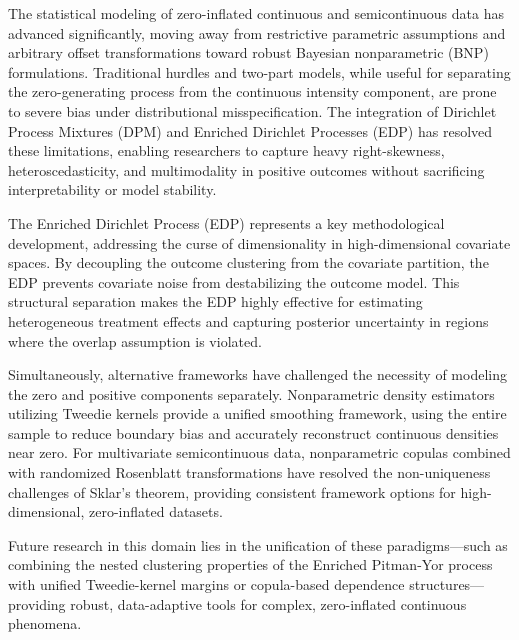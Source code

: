 \documentclass[11pt, a4paper]{article}
\begin{document}
The statistical modeling of zero-inflated continuous and semicontinuous data has advanced significantly, moving away from restrictive parametric assumptions and arbitrary offset transformations toward robust Bayesian nonparametric (BNP) formulations.\cite{olsen2001, albert2005, duan1983, oganisian2020} Traditional hurdles and two-part models, while useful for separating the zero-generating process from the continuous intensity component, are prone to severe bias under distributional misspecification.\cite{olsen2001, manning2001} The integration of Dirichlet Process Mixtures (DPM) and Enriched Dirichlet Processes (EDP) has resolved these limitations, enabling researchers to capture heavy right-skewness, heteroscedasticity, and multimodality in positive outcomes without sacrificing interpretability or model stability.\cite{olsen2001, oganisian2020, wade2011}

The Enriched Dirichlet Process (EDP) represents a key methodological development, addressing the curse of dimensionality in high-dimensional covariate spaces.\cite{wade2011} By decoupling the outcome clustering from the covariate partition, the EDP prevents covariate noise from destabilizing the outcome model.\cite{wade2011} This structural separation makes the EDP highly effective for estimating heterogeneous treatment effects and capturing posterior uncertainty in regions where the overlap assumption is violated.\cite{oganisian2021, wade2011}

Simultaneously, alternative frameworks have challenged the necessity of modeling the zero and positive components separately.\cite{kokonendji2021} Nonparametric density estimators utilizing Tweedie kernels provide a unified smoothing framework, using the entire sample to reduce boundary bias and accurately reconstruct continuous densities near zero.\cite{albert2005, kokonendji2021} For multivariate semicontinuous data, nonparametric copulas combined with randomized Rosenblatt transformations have resolved the non-uniqueness challenges of Sklar's theorem, providing consistent framework options for high-dimensional, zero-inflated datasets.\cite{craiu2012, schepsmeier2016} 

Future research in this domain lies in the unification of these paradigms---such as combining the nested clustering properties of the Enriched Pitman-Yor process with unified Tweedie-kernel margins or copula-based dependence structures---providing robust, data-adaptive tools for complex, zero-inflated continuous phenomena.
\end{document}
